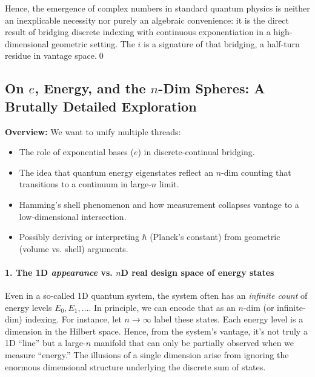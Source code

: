 \documentclass{article}
\begin{document}
Hence, the emergence of complex numbers in standard quantum physics is neither an inexplicable necessity nor purely an algebraic convenience: it is the direct result of bridging discrete indexing with continuous exponentiation in a high-dimensional geometric setting. The $i$ is a signature of that bridging, a half-turn residue in vantage space.\qed






\subsection*{On $e$, Energy, and the $n$-Dim Spheres: A Brutally Detailed Exploration}

\noindent\textbf{Overview:} We want to unify multiple threads:
\begin{itemize}
\item The role of exponential bases ($e$) in discrete-continual bridging.
\item The idea that quantum energy eigenstates reflect an $n$-dim counting that transitions to a continuum in large-$n$ limit.
\item Hamming’s shell phenomenon and how measurement collapses vantage to a low-dimensional intersection.
\item Possibly deriving or interpreting $\hbar$ (Planck’s constant) from geometric (volume vs. shell) arguments.
\end{itemize}

\paragraph{1. The 1D \emph{appearance} vs. $n$D real design space of energy states}

Even in a so-called 1D quantum system, the system often has an \emph{infinite count} of energy levels $E_0, E_1,\dots$. In principle, we can encode that as an $n$-dim (or infinite-dim) indexing. For instance, let $n \to \infty$ label these states. Each energy level is a dimension in the Hilbert space. Hence, from the system’s vantage, it’s not truly a 1D “line” but a large-$n$ manifold that can only be partially observed when we measure “energy.” The illusions of a single dimension arise from ignoring the enormous dimensional structure underlying the discrete sum of states.
\end{document}
